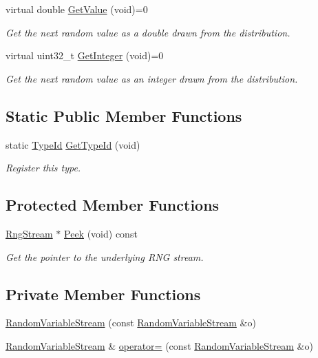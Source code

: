 \begin{DoxyCompactItemize}
virtual double \hyperlink{classns3_1_1RandomVariableStream_a4fa5944dc4cb11544e661ed23072b36c}{Get\+Value} (void)=0
\begin{DoxyCompactList}\small\item\em Get the next random value as a double drawn from the distribution. \end{DoxyCompactList}\item 
virtual uint32\+\_\+t \hyperlink{classns3_1_1RandomVariableStream_a66cd94e6305ce7f000f1a9ff0fcb9aef}{Get\+Integer} (void)=0
\begin{DoxyCompactList}\small\item\em Get the next random value as an integer drawn from the distribution. \end{DoxyCompactList}\end{DoxyCompactItemize}
\subsection*{Static Public Member Functions}
\begin{DoxyCompactItemize}
\item 
static \hyperlink{classns3_1_1TypeId}{Type\+Id} \hyperlink{classns3_1_1RandomVariableStream_a0b11fa19bc54cca33458c4e1fe7226d5}{Get\+Type\+Id} (void)
\begin{DoxyCompactList}\small\item\em Register this type. \end{DoxyCompactList}\end{DoxyCompactItemize}
\subsection*{Protected Member Functions}
\begin{DoxyCompactItemize}
\item 
\hyperlink{classns3_1_1RngStream}{Rng\+Stream} $\ast$ \hyperlink{classns3_1_1RandomVariableStream_ac5aa8d691c061bcc88a909dc9b479222}{Peek} (void) const 
\begin{DoxyCompactList}\small\item\em Get the pointer to the underlying R\+NG stream. \end{DoxyCompactList}\end{DoxyCompactItemize}
\subsection*{Private Member Functions}
\begin{DoxyCompactItemize}
\item 
\hyperlink{classns3_1_1RandomVariableStream_a66e43b9850d3b5911ccd53e497bce8fb}{Random\+Variable\+Stream} (const \hyperlink{classns3_1_1RandomVariableStream}{Random\+Variable\+Stream} \&o)
\item 
\hyperlink{classns3_1_1RandomVariableStream}{Random\+Variable\+Stream} \& \hyperlink{classns3_1_1RandomVariableStream_a744eca4c0c6657311eb25d441052fe4d}{operator=} (const \hyperlink{classns3_1_1RandomVariableStream}{Random\+Variable\+Stream} \&o)
\end{DoxyCompactItemize}
